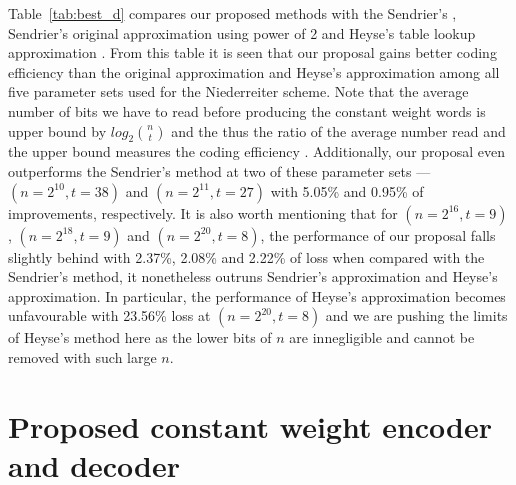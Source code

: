 \documentclass[10pt,journal,compsoc]{IEEEtran}
\begin{document}



Table~\ref{tab:best_d} compares our proposed methods with the Sendrier's \cite{sendrier2005encoding},
Sendrier's original approximation using power of 2 \cite{sendrier2005encoding} and Heyse's table lookup approximation \cite{heyse2010low}.
From this table it is seen that our proposal gains  better coding efficiency than the original approximation and Heyse's approximation among all five parameter sets used for the Niederreiter scheme. Note that the average number of bits we have to read before producing the constant weight words is upper bound by
$log_2\binom{n}{t}$ and the thus the ratio of the average number read and the upper bound measures the coding efficiency \cite{sendrier2005encoding}. Additionally, our proposal even outperforms the Sendrier's method at two of these parameter sets --- $(n=2^{10},t=38)$ and $(n=2^{11},t=27)$
with 5.05\% and  0.95\% of improvements, respectively. It is also worth mentioning that for $(n=2^{16},t=9)$, $(n=2^{18},t=9)$  and $(n=2^{20},t=8)$, the performance of our proposal falls slightly behind with 2.37\%, 2.08\% and 2.22\% of loss when compared with the Sendrier's method, it nonetheless outruns Sendrier's approximation and Heyse's approximation. In particular, the performance of Heyse's approximation
becomes unfavourable with 23.56\% loss at $(n=2^{20},t=8)$ and we are pushing the limits of Heyse's method here
as the lower bits of $n$ are innegligible and cannot be removed with such large $n$.


\section{Proposed constant weight encoder and decoder}
\end{document}
